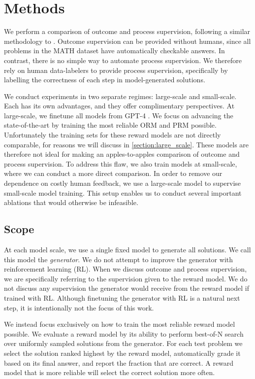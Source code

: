 \section{Methods}

We perform a comparison of outcome and process supervision, following a similar methodology to \cite{uesato2022solving}. Outcome supervision can be provided without humans, since all problems in the MATH dataset have automatically checkable answers. In contrast, there is no simple way to automate process supervision. We therefore rely on human data-labelers to provide process supervision, specifically by labelling the correctness of each step in model-generated solutions.

We conduct experiments in two separate regimes: large-scale and small-scale. Each has its own advantages, and they offer complimentary perspectives. At large-scale, we finetune all models from GPT-4 \citep{gpt4}. We focus on advancing the state-of-the-art by training the most reliable ORM and PRM possible. Unfortunately the training sets for these reward models are not directly comparable, for reasons we will discuss in \ref{section:large_scale}. These models are therefore not ideal for making an apples-to-apples comparison of outcome and process supervision. To address this flaw, we also train models at small-scale, where we can conduct a more direct comparison. In order to remove our dependence on costly human feedback, we use a large-scale model to supervise small-scale model training. This setup enables us to conduct several important ablations that would otherwise be infeasible.

\subsection{Scope}

At each model scale, we use a single fixed model to generate all solutions. We call this model the \textit{generator}. We do not attempt to improve the generator with reinforcement learning (RL). When we discuss outcome and process supervision, we are specifically referring to the supervision given to the reward model. We do not discuss any supervision the generator would receive from the reward model if trained with RL. Although finetuning the generator with RL is a natural next step, it is intentionally not the focus of this work.

We instead focus exclusively on how to train the most reliable reward model possible. We evaluate a reward model by its ability to perform best-of-N search over uniformly sampled solutions from the generator. For each test problem we select the solution ranked highest by the reward model, automatically grade it based on its final answer, and report the fraction that are correct. A reward model that is more reliable will select the correct solution more often.

